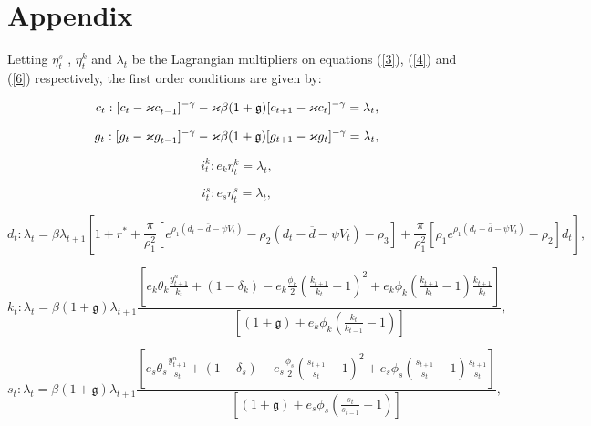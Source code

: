 \documentclass[11pt]{article}
\begin{document}
\section{Appendix}

Letting $\eta _{t}^{s}$ , $\eta _{t}^{k}$ and $\lambda _{t}$ be the
Lagrangian multipliers on equations (\ref{3}), (\ref{4}) and (\ref{6})
respectively, the first order conditions are given by:

\begin{equation}
c_{t}:[c_{t}-\varkappa c_{t-1}^{{}}]^{-\gamma }-\varkappa \beta (1+\mathfrak{%
g})[c_{t+1}-\varkappa c_{t}]^{-\gamma }=\lambda _{t},  \label{A1}
\end{equation}

\begin{equation}
g_{t}:[g_{t}-\varkappa g_{t-1}^{{}}]^{-\gamma }-\varkappa \beta (1+\mathfrak{%
g})[g_{t+1}-\varkappa g_{t}]^{-\gamma }=\lambda _{t},
\end{equation}

\begin{equation}
i_{t}^{k}:e_{k}\eta _{t}^{k}=\lambda _{t},  \label{A3}
\end{equation}

\begin{equation}
i_{t}^{s}:e_{s}\eta _{t}^{s}=\lambda _{t},  \label{A4}
\end{equation}

\begin{equation}
d_{t}:\lambda _{t}=\beta \lambda _{t+1}\left[ 1+r^{\ast }+\frac{\pi }{\rho
_{1}^{2}}\left[ e_{{}}^{\rho _{1}(d_{t}-\bar{d}-\psi V_{t})}-\rho _{2}(d_{t}-%
\overline{d}-\psi V_{t})-\rho _{3}\right] +\frac{\pi }{\rho _{1}^{2}}\left[
\rho _{1}e_{{}}^{\rho _{1}(d_{t}-\bar{d}-\psi V_{t})}-\rho _{2}\right] d_{t}%
\right] ,  \label{A5}
\end{equation}

\begin{equation}
k_{t}:\lambda _{t}=\beta (1+\mathfrak{g})\lambda _{t+1}\frac{\left[
e_{k}\theta _{k}\frac{y_{t+1}^{n}}{k_{t}}+(1-\delta _{k})-e_{k}\frac{\phi
_{k}}{2}\left( \frac{k_{t+1}}{k_{t}}-1\right) ^{2}+e_{k}\phi _{k}\left( 
\frac{k_{t+1}}{k_{t}}-1\right) \frac{k_{t+1}}{k_{t}}\right] }{\left[ (1+%
\mathfrak{g})+e_{k}\phi _{k}\left( \frac{k_{t}}{k_{t-1}}-1\right) \right] },
\label{A6}
\end{equation}

\begin{equation}
s_{t}:\lambda _{t}=\beta (1+\mathfrak{g})\lambda _{t+1}\frac{\left[
e_{s}\theta _{s}\frac{y_{t+1}^{n}}{s_{t}}+(1-\delta _{s})-e_{s}\frac{\phi
_{s}}{2}\left( \frac{s_{t+1}}{s_{t}}-1\right) ^{2}+e_{s}\phi _{s}\left( 
\frac{s_{t+1}}{s_{t}}-1\right) \frac{s_{t+1}}{s_{t}}\right] }{\left[ (1+%
\mathfrak{g})+e_{s}\phi _{s}\left( \frac{s_{t}}{s_{t-1}}-1\right) \right] },
\label{A7}
\end{equation}
\end{document}
